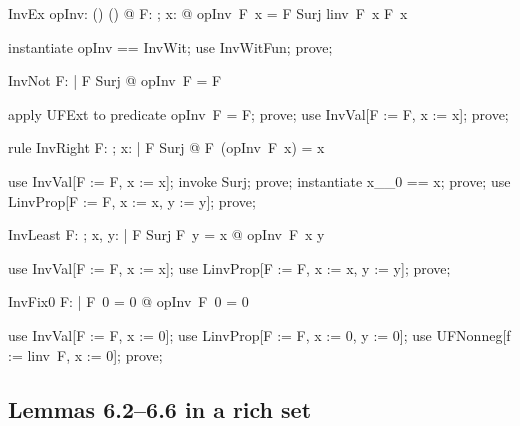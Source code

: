 \documentclass{article}
\begin{document}
\begin{theorem}{InvEx}
  \exists opInv: (\nat \fun \nat) \fun (\nat \fun \nat) @ \forall F: \nat \fun \nat; x: \nat @ opInv~F~x = \IF F \in Surj \THEN linv~F~x \ELSE F~x
\end{theorem}

\begin{zproof}
instantiate opInv == InvWit;
use InvWitFun;
prove;
\end{zproof}

\begin{theorem}{InvNot}
  \forall F: \nat \fun \nat | \lnot F \in Surj @ opInv~F = F
\end{theorem}

\begin{zproof}
apply UFExt to predicate opInv~F = F;
prove;
use InvVal[F := F, x := x];
prove;
\end{zproof}

\begin{theorem}{rule InvRight}
  \forall F: \nat \fun \nat; x: \nat | F \in Surj @ F~(opInv~F~x) = x
\end{theorem}

\begin{zproof}
use InvVal[F := F, x := x];
invoke Surj;
prove;
instantiate x\_\_0 == x;
prove;
use LinvProp[F := F, x := x, y := y];
prove;
\end{zproof}

\begin{theorem}{InvLeast}
  \forall F: \nat \fun \nat; x, y: \nat | F \in Surj \land F~y = x @ opInv~F~x \leq y
\end{theorem}

\begin{zproof}
use InvVal[F := F, x := x];
use LinvProp[F := F, x := x, y := y];
prove;
\end{zproof}

\begin{theorem}{InvFix0}
  \forall F: \nat \fun \nat | F~0 = 0 @ opInv~F~0 = 0
\end{theorem}

\begin{zproof}
use InvVal[F := F, x := 0];
use LinvProp[F := F, x := 0, y := 0];
use UFNonneg[f := linv~F, x := 0];
prove;
\end{zproof}

\subsection{Lemmas 6.2--6.6 in a rich set}
\end{document}
